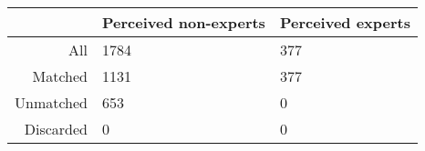 \begin{table}[ht]
\centering
\begin{tabular}{rll}
  \hline
 & Perceived non-experts & Perceived experts \\ 
  \hline
All & 1784 & 377 \\ 
  Matched & 1131 & 377 \\ 
  Unmatched & 653 & 0 \\ 
  Discarded & 0 & 0 \\ 
   \hline
\end{tabular}
\end{table}
